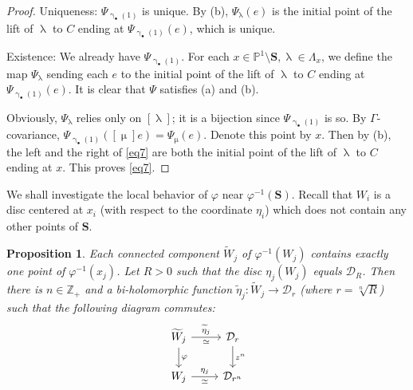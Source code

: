 \documentclass[12pt,a4paper,notitlepage]{article}
\theoremstyle{definition}
\theoremstyle{plain}
\newtheorem{pp}[df]{Proposition}
\newcommand{\mc}{\mathcal}
\newcommand{\wtd}{\widetilde}
\newcommand{\blt}{\bullet}
\newcommand{\Zbb}{\mathbb Z}
\newcommand{\Pbb}{\mathbb P}
\newcommand{\Sbf}{\mathbf{S}}
\numberwithin{equation}{subsection}
\begin{document}
\begin{proof}
Uniqueness: $\Psi_{\upgamma_\blt(1)}$ is unique. By (b), $\Psi_\uplambda(e)$ is the initial point of the lift of $\uplambda$ to $C$ ending at $\Psi_{\upgamma_\blt(1)}(e)$, which is unique.

Existence: We already have $\Psi_{\upgamma_\blt(1)}$. For each $x\in\Pbb^1\setminus\Sbf,\uplambda\in\Lambda_x$, we define the map $\Psi_\uplambda$ sending each $e$ to the initial point of the lift of $\uplambda$ to $C$ ending at $\Psi_{\upgamma_\blt(1)}(e)$. It is clear that $\Psi$ satisfies (a) and (b). 

Obviously, $\Psi_\uplambda$ relies only on $[\uplambda]$; it is a bijection since $\Psi_{\upgamma_\blt(1)}$ is so. By $\Gamma$-covariance, $\Psi_{\upgamma_\blt(1)}([\upmu]e)=\Psi_{\upmu}(e)$. Denote this point by $x$. Then by (b), the left and the right of \eqref{eq7} are both the initial point of the lift of $\uplambda$ to $C$ ending at $x$. This proves \eqref{eq7}.	
\end{proof}










We shall investigate the local behavior of $\varphi$ near $\varphi^{-1}(\Sbf)$. Recall that $W_i$ is a disc centered at $x_i$ (with respect to the coordinate $\eta_i$) which does not contain any other points of $\Sbf$.

\begin{pp}\label{lb5}
Each connected component $\wtd W_j$ of $\varphi^{-1}(W_j)$ contains exactly one point of $\varphi^{-1}(x_j)$. Let $R>0$ such that the disc $\eta_j(W_j)$ equals $\mc D_R$. Then there is $n\in\Zbb_+$ and a bi-holomorphic function $\wtd\eta_j:\wtd W_j\rightarrow\mc D_r$ (where $r=\sqrt[n]R$) such that the following diagram commutes: 
\begin{equation}
\begin{tikzcd}
\wtd W_j \arrow[r, "\wtd\eta_j","\simeq"'] \arrow[d, "\varphi"]
& \mc D_r \arrow[d, "z^n"] \\
W_j \arrow[r,  "\eta_j","\simeq"']
&  \mc D_{r^n}
\end{tikzcd}	\label{eq4}
\end{equation}
\end{pp}
\end{document}
